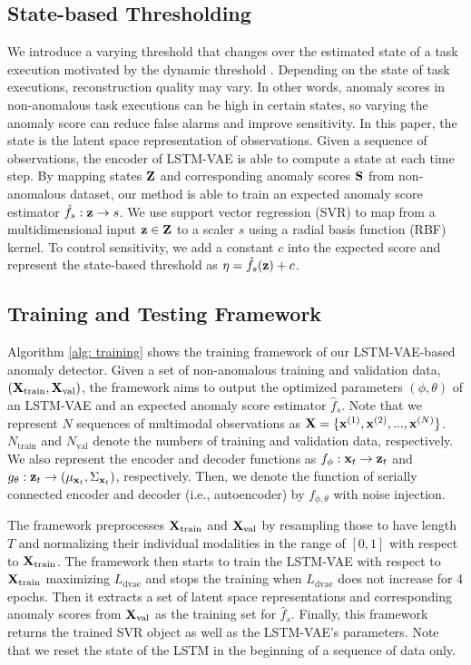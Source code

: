 \documentclass[letterpaper, 10 pt, conference]{ieeeconf}
\newcommand{\vz}{{\bf z}}
\newcommand{\vZ}{{\bf Z}}
\newcommand{\vx}{{\bf x}}
\newcommand{\vS}{{\bf S}}
\newcommand{\vX}{{\bf X}}
\begin{document}
\subsection{State-based Thresholding}
We introduce a varying threshold that changes over the estimated state of a task execution motivated by the dynamic threshold \cite{park2016multimodal}. Depending on the state of task executions, reconstruction quality may vary. In other words, anomaly scores in non-anomalous task executions can be high in certain states, so varying the anomaly score can reduce false alarms and improve sensitivity. In this paper, the state is the latent space representation of observations. Given a sequence of observations, the encoder of LSTM-VAE is able to compute a state at each time step. By mapping states $\vZ$ and corresponding anomaly scores $\vS$ from non-anomalous dataset, our method is able to train an expected anomaly score estimator $\hat{f}_s: \vz \rightarrow s$. We use support vector regression (SVR) to map from a multidimensional input $\vz \in \vZ$ to a scaler $s$ using a radial basis function (RBF) kernel. To control sensitivity, we add a constant $c$ into the expected score and represent the state-based threshold as $\eta = \hat{f}_s(\vz) + c$.

\subsection{Training and Testing Framework}
Algorithm \ref{alg: training} shows the training framework of our LSTM-VAE-based anomaly detector. Given a set of non-anomalous training and validation data, $(\vX_{\mathrm{train}}, \vX_{\mathrm{val}})$, the framework aims to output the optimized parameters $(\phi, \theta)$ of an LSTM-VAE and an expected anomaly score estimator $\hat{f}_s$. Note that we represent $N$ sequences of multimodal observations as $\vX = \{\vx^{(1)}, \vx^{(2)}, ... , \vx^{(N)} \}$. $N_{\mathrm{train}}$ and $N_{\mathrm{val}}$ denote the numbers of training and validation data, respectively. We also represent the encoder and decoder functions as $f_\phi: \vx_{t} \rightarrow \vz_{t}$ and $g_\theta: \vz_{t} \rightarrow (\mu_{\vx_t}, \Sigma_{\vx_t})$, respectively. Then, we denote the function of serially connected encoder and decoder (i.e., autoencoder) by $f_{\phi, \theta}$ with noise injection.

The framework preprocesses $\vX_{\mathrm{train}}$ and $\vX_{\mathrm{val}}$ by resampling those to have length $T$ and normalizing their individual modalities in the range of $[0,1]$ with respect to $\vX_{\mathrm{train}}$. The framework then starts to train the LSTM-VAE with respect to $\vX_{\mathrm{train}}$ maximizing $L_{\mathrm{dvae}}$ and stops the training when $L_{\mathrm{dvae}}$ does not increase for 4 epochs. Then it extracts a set of latent space representations and corresponding anomaly scores from $\vX_{\mathrm{val}}$ as the training set for $\hat{f}_s$. Finally, this framework returns the trained SVR object as well as the LSTM-VAE's parameters. Note that we reset the state of the LSTM in the beginning of a sequence of data only. 
\end{document}

